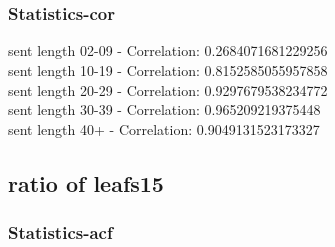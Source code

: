 \documentclass{article}%
\begin{document}
\begin{figure}[ht]%
\centering%
\setlength{\abovecaptionskip}{-35pt}%
%
%
\\%
%
%
\\%
%
\end{figure}

%
\newpage%
\subsubsection{Statistics{-}cor}%
\label{ssubsec:Statistics{-}cor}%
\noindent%
sent length 02-09 - Correlation: 0.2684071681229256\\%
sent length 10-19 - Correlation: 0.8152585055957858\\%
sent length 20-29 - Correlation: 0.9297679538234772\\%
sent length 30-39 - Correlation: 0.965209219375448\\%
sent length 40+ - Correlation: 0.9049131523173327\\

%
\newpage

%
\subsection{ratio of leafs15}%
\label{subsec:ratioofleafs15}%
\subsubsection{Statistics{-}acf}%
\label{ssubsec:Statistics{-}acf}%
\end{document}
